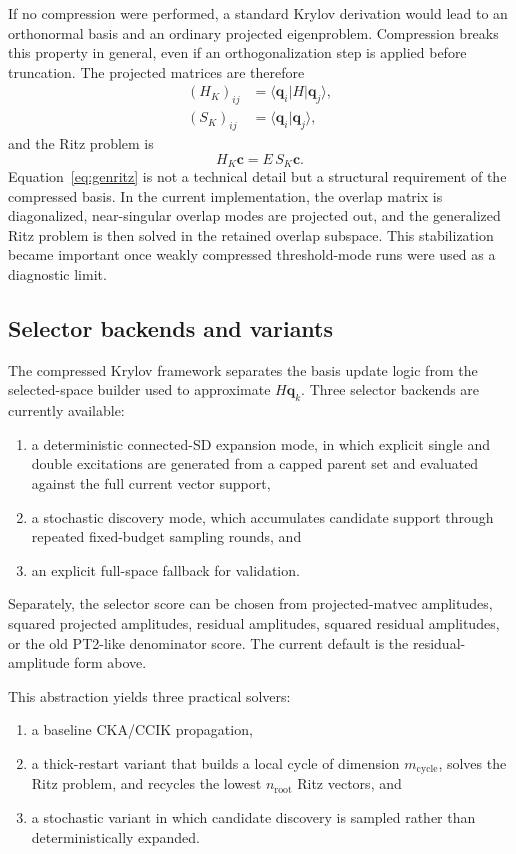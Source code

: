 \documentclass[aip,jcp,preprint,longbibliography]{revtex4-2}
\begin{document}
If no compression were performed, a standard Krylov derivation would lead to an orthonormal basis and an ordinary projected eigenproblem. Compression breaks this property in general, even if an orthogonalization step is applied before truncation. The projected matrices are therefore
\begin{align}
(H_K)_{ij} &= \langle \bm q_i | H | \bm q_j \rangle, \\
(S_K)_{ij} &= \langle \bm q_i | \bm q_j \rangle,
\end{align}
and the Ritz problem is
\begin{equation}
H_K \bm c = E\, S_K \bm c.
\label{eq:genritz}
\end{equation}
Equation~\eqref{eq:genritz} is not a technical detail but a structural requirement of the compressed basis. In the current implementation, the overlap matrix is diagonalized, near-singular overlap modes are projected out, and the generalized Ritz problem is then solved in the retained overlap subspace. This stabilization became important once weakly compressed threshold-mode runs were used as a diagnostic limit.

\subsection{Selector backends and variants}
The compressed Krylov framework separates the basis update logic from the selected-space builder used to approximate $H\bm q_k$. Three selector backends are currently available:
\begin{enumerate}
  \item a deterministic connected-SD expansion mode, in which explicit single and double excitations are generated from a capped parent set and evaluated against the full current vector support,
  \item a stochastic discovery mode, which accumulates candidate support through repeated fixed-budget sampling rounds, and
  \item an explicit full-space fallback for validation.
\end{enumerate}

Separately, the selector score can be chosen from projected-matvec amplitudes, squared projected amplitudes, residual amplitudes, squared residual amplitudes, or the old PT2-like denominator score. The current default is the residual-amplitude form above.

This abstraction yields three practical solvers:
\begin{enumerate}
  \item a baseline CKA/CCIK propagation,
  \item a thick-restart variant that builds a local cycle of dimension $m_{\mathrm{cycle}}$, solves the Ritz problem, and recycles the lowest $n_{\mathrm{root}}$ Ritz vectors, and
  \item a stochastic variant in which candidate discovery is sampled rather than deterministically expanded.
\end{enumerate}
\end{document}
